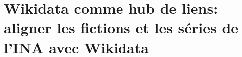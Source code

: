 \section{\label{III-A-3}Wikidata comme hub de liens: aligner les fictions et les séries de l'INA avec Wikidata}


